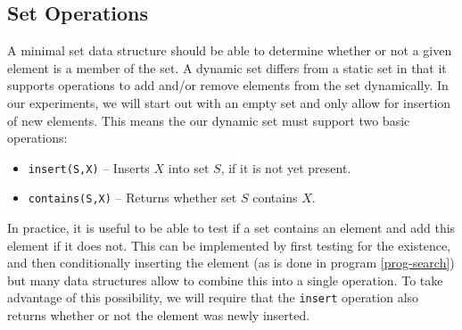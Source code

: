 \documentclass{acm_proc_article-sp}
\begin{document}

\subsection{Set Operations}
A minimal set data structure should be able to determine whether or not a given element is a member of the set. A dynamic set differs from a static set in that it supports operations to add and/or remove elements from the set dynamically. In our experiments, we will start out with an empty set and only allow for insertion of new elements. This means the our dynamic set must support two basic operations:
\begin{itemize}
\item \verb#insert(S,X)# -- Inserts $X$ into set $S$, if it is not yet present.
\item \verb#contains(S,X)# -- Returns whether set $S$ contains $X$.
\end{itemize}
In practice, it is useful to be able to test if a set contains an element and add this element if it does not. This can be implemented by first testing for the existence, and then conditionally inserting the element (as is done in program \ref{prog-search}) but many data structures allow to combine this into a single operation. To take advantage of this possibility, we will require that the \verb#insert# operation also returns whether or not the element was newly inserted.
\end{document}

